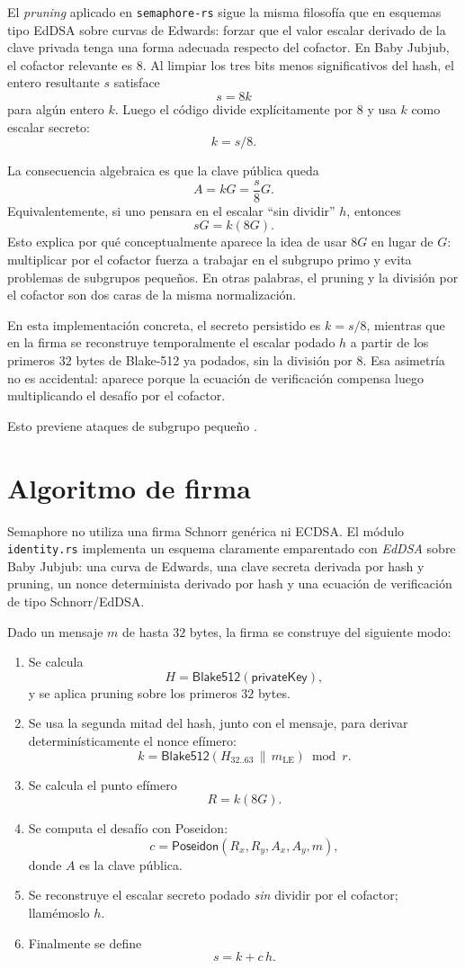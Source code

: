 \documentclass[11pt,a4paper]{article}
\begin{document}
	El \emph{pruning} aplicado en \texttt{semaphore-rs} sigue la misma filosofía que en esquemas tipo EdDSA sobre curvas de Edwards: forzar que el valor escalar derivado de la clave privada tenga una forma adecuada respecto del cofactor. En Baby Jubjub, el cofactor relevante es $8$. Al limpiar los tres bits menos significativos del hash, el entero resultante $s$ satisface
	\[
	s = 8k
	\]
	para algún entero $k$. Luego el código divide explícitamente por $8$ y usa $k$ como escalar secreto:
	\[
	k = s / 8.
	\]
	
	La consecuencia algebraica es que la clave pública queda
	\[
	A = kG = \frac{s}{8}G.
	\]
	Equivalentemente, si uno pensara en el escalar ``sin dividir'' $h$, entonces
	\[
	sG = k(8G).
	\]
	Esto explica por qué conceptualmente aparece la idea de usar $8G$ en lugar de $G$: multiplicar por el cofactor fuerza a trabajar en el subgrupo primo y evita problemas de subgrupos pequeños. En otras palabras, el pruning y la división por el cofactor son dos caras de la misma normalización.
	
	En esta implementación concreta, el secreto persistido es $k=s/8$, mientras que en la firma se reconstruye temporalmente el escalar podado $h$ a partir de los primeros $32$ bytes de Blake-512 ya podados, sin la división por $8$. Esa asimetría no es accidental: aparece porque la ecuación de verificación compensa luego multiplicando el desafío por el cofactor.
	
	Esto previene ataques de subgrupo pequeño \cite{bernstein2008}.
	
	\section{Algoritmo de firma}
	
	Semaphore no utiliza una firma Schnorr genérica ni ECDSA. El módulo \texttt{identity.rs} implementa un esquema claramente emparentado con \emph{EdDSA} sobre Baby Jubjub: una curva de Edwards, una clave secreta derivada por hash y pruning, un nonce determinista derivado por hash y una ecuación de verificación de tipo Schnorr/EdDSA.
	
	Dado un mensaje $m$ de hasta $32$ bytes, la firma se construye del siguiente modo:
	\begin{enumerate}
		\item Se calcula
		\[
		H = \mathsf{Blake512}(\mathsf{privateKey}),
		\]
		y se aplica pruning sobre los primeros $32$ bytes.
		\item Se usa la segunda mitad del hash, junto con el mensaje, para derivar determinísticamente el nonce efímero:
		\[
		k = \mathsf{Blake512}(H_{32..63} \,\|\, m_{\mathrm{LE}}) \bmod r.
		\]
		\item Se calcula el punto efímero
		\[
		R = k(8G).
		\]
		\item Se computa el desafío con Poseidon:
		\[
		c = \mathsf{Poseidon}(R_x, R_y, A_x, A_y, m),
		\]
		donde $A$ es la clave pública.
		\item Se reconstruye el escalar secreto podado \emph{sin} dividir por el cofactor; llamémoslo $h$.
		\item Finalmente se define
		\[
		s = k + c\,h.
		\]
	\end{enumerate}
	
\end{document}
